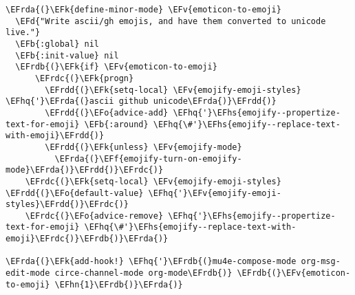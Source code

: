 \documentclass[a4wide,10pt]{article}
\newcommand{\EFd}[1]{\textcolor{EFd}{#1}} %
\newcommand{\EFk}[1]{\textcolor{EFk}{#1}} %
\newcommand{\EFb}[1]{\textcolor{EFb}{#1}} %
\newcommand{\EFf}[1]{\textcolor{EFf}{#1}} %
\newcommand{\EFv}[1]{\textcolor{EFv}{#1}} %
\newcommand{\EFo}[1]{\textcolor{EFo}{#1}} %
\newcommand{\EFhn}[1]{\textcolor{EFhn}{\textbf{#1}}} %
\newcommand{\EFhq}[1]{\textcolor{EFhq}{#1}} %
\newcommand{\EFhs}[1]{\textcolor{EFhs}{#1}} %
\newcommand{\EFrda}[1]{\textcolor{EFrda}{#1}} %
\newcommand{\EFrdb}[1]{\textcolor{EFrdb}{#1}} %
\newcommand{\EFrdc}[1]{\textcolor{EFrdc}{#1}} %
\newcommand{\EFrdd}[1]{\textcolor{EFrdd}{#1}} %
\begin{document}
\begin{Code}
\begin{Verbatim}
\EFrda{(}\EFk{define-minor-mode} \EFv{emoticon-to-emoji}
  \EFd{"Write ascii/gh emojis, and have them converted to unicode live."}
  \EFb{:global} nil
  \EFb{:init-value} nil
  \EFrdb{(}\EFk{if} \EFv{emoticon-to-emoji}
      \EFrdc{(}\EFk{progn}
        \EFrdd{(}\EFk{setq-local} \EFv{emojify-emoji-styles} \EFhq{'}\EFrda{(}ascii github unicode\EFrda{)}\EFrdd{)}
        \EFrdd{(}\EFo{advice-add} \EFhq{'}\EFhs{emojify--propertize-text-for-emoji} \EFb{:around} \EFhq{\#'}\EFhs{emojify--replace-text-with-emoji}\EFrdd{)}
        \EFrdd{(}\EFk{unless} \EFv{emojify-mode}
          \EFrda{(}\EFf{emojify-turn-on-emojify-mode}\EFrda{)}\EFrdd{)}\EFrdc{)}
    \EFrdc{(}\EFk{setq-local} \EFv{emojify-emoji-styles} \EFrdd{(}\EFo{default-value} \EFhq{'}\EFv{emojify-emoji-styles}\EFrdd{)}\EFrdc{)}
    \EFrdc{(}\EFo{advice-remove} \EFhq{'}\EFhs{emojify--propertize-text-for-emoji} \EFhq{\#'}\EFhs{emojify--replace-text-with-emoji}\EFrdc{)}\EFrdb{)}\EFrda{)}

\EFrda{(}\EFk{add-hook!} \EFhq{'}\EFrdb{(}mu4e-compose-mode org-msg-edit-mode circe-channel-mode org-mode\EFrdb{)} \EFrdb{(}\EFv{emoticon-to-emoji} \EFhn{1}\EFrdb{)}\EFrda{)}
\end{Verbatim}
\end{Code}
\end{document}

